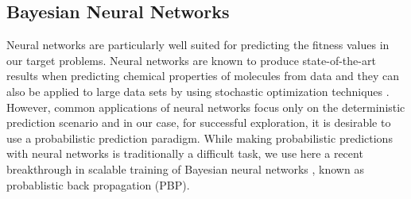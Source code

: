 \subsection{Bayesian Neural Networks}


Neural networks are particularly well suited for predicting the fitness values in our target problems.
Neural networks are known to produce state-of-the-art results when predicting chemical properties of molecules from data
\cite{Ma_2015,Mayr_2016,ramsundar2015massively} and they can also be applied to large data sets by using 
stochastic optimization techniques \cite{bousquet2008tradeoffs}. However, common applications of neural
networks focus only on the deterministic prediction scenario and in our case, for successful exploration, it is
desirable to use a probabilistic prediction paradigm. While making probabilistic predictions with neural networks is traditionally a difficult task, we use here a recent breakthrough in scalable training of Bayesian neural networks \cite{hernandez2015probabilistic}, known as probablistic back propagation (PBP). 

